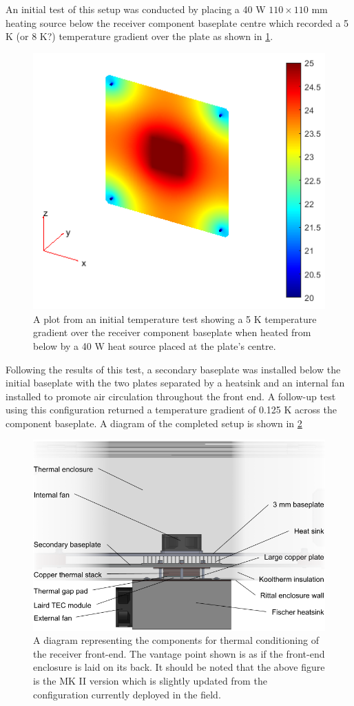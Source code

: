 An initial test of this setup was conducted by placing a 40 W $110 \times 110$ mm heating source below the receiver component baseplate centre which recorded a 5 K (or 8 K?) temperature gradient over the plate as shown in \cref{fig:base_temp_grad}.
\begin{figure}
    \centering
    \includegraphics[scale=0.6]{base_temp_grad}
    \caption{A plot from an initial temperature test showing a 5 K temperature gradient over the receiver component baseplate when heated from below by a 40 W heat source placed at the plate's centre.}
    \label{fig:base_temp_grad}
\end{figure}
Following the results of this test, a secondary baseplate was installed below the initial baseplate with the two plates separated by a heatsink and an internal fan installed to promote air circulation throughout the front end. A follow-up test using this configuration returned a temperature gradient of 0.125 K across the component baseplate. A diagram of the completed setup is shown in \cref{fig:peltier_diag}
\begin{figure}
    \centering
    \includegraphics[width=\textwidth]{reach_peltier_diagram}
    \caption{A diagram representing the components for thermal conditioning of the receiver front-end. The vantage point shown is as if the front-end enclosure is laid on its back. It should be noted that the above figure is the MK II version which is slightly updated from the configuration currently deployed in the field.}
    \label{fig:peltier_diag}
\end{figure}

